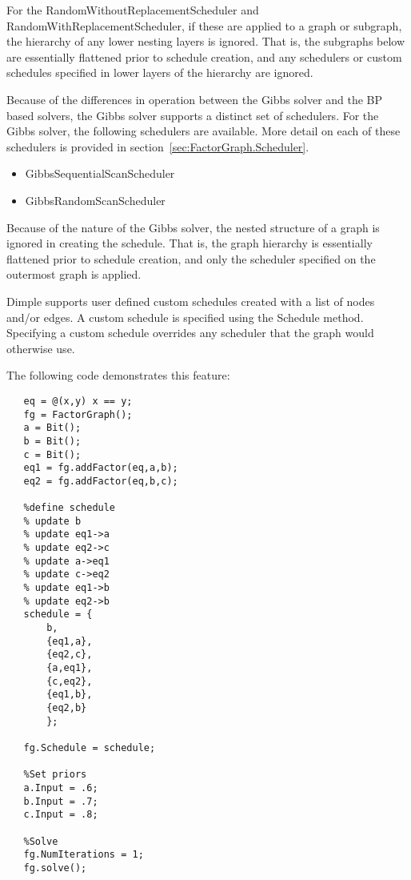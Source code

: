 For the RandomWithoutReplacementScheduler and RandomWithReplacementScheduler, if these are applied to a graph or subgraph, the hierarchy of any lower nesting layers is ignored.  That is, the subgraphs below are essentially flattened prior to schedule creation, and any schedulers or custom schedules specified in lower layers of the hierarchy are ignored.


Because of the differences in operation between the Gibbs solver and the BP based solvers, the Gibbs solver supports a distinct set of schedulers.  For the Gibbs solver, the following schedulers are available.  More detail on each of these schedulers is provided in section~\ref{sec:FactorGraph.Scheduler}.

\begin{itemize}
\item GibbsSequentialScanScheduler
\item GibbsRandomScanScheduler
\end{itemize}

Because of the nature of the Gibbs solver, the nested structure of a graph is ignored in creating the schedule.  That is, the graph hierarchy is essentially flattened prior to schedule creation, and only the scheduler specified on the outermost graph is applied.


\label{sec:CustomSchedules}


Dimple supports user defined custom schedules created with a list of nodes and/or edges.  A custom schedule is specified using the Schedule method.  Specifying a custom schedule overrides any scheduler that the graph would otherwise use.

The following code demonstrates this feature:

\ifmatlab

\begin{lstlisting}
   eq = @(x,y) x == y;
   fg = FactorGraph();
   a = Bit();
   b = Bit();
   c = Bit();
   eq1 = fg.addFactor(eq,a,b);
   eq2 = fg.addFactor(eq,b,c);
   
   %define schedule
   % update b
   % update eq1->a
   % update eq2->c
   % update a->eq1
   % update c->eq2
   % update eq1->b
   % update eq2->b
   schedule = {
       b,
       {eq1,a},
       {eq2,c},
       {a,eq1},
       {c,eq2},
       {eq1,b},
       {eq2,b}
       };
   
   fg.Schedule = schedule;
   
   %Set priors
   a.Input = .6;
   b.Input = .7;
   c.Input = .8;
   
   %Solve
   fg.NumIterations = 1;
   fg.solve();
\end{lstlisting}

